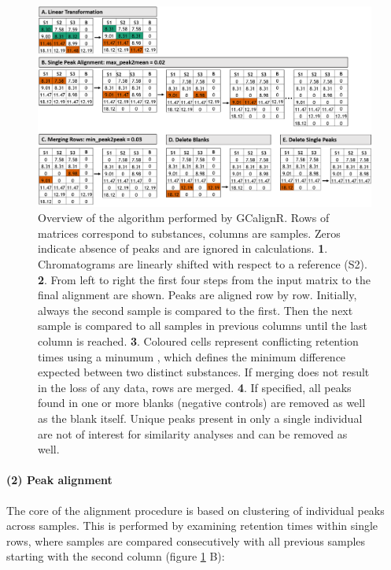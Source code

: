 \begin{figure}[htbp]
  \centering
  \includegraphics[width=13cm]{figures/algorithm}
  \caption{Overview of the algorithm performed by GCalignR. Rows of matrices correspond to substances, columns are samples. Zeros indicate absence of peaks and are ignored in calculations. \textbf{1}. Chromatograms are linearly shifted with respect to a reference (S2). \textbf{2}. From left to right the first four steps from the input matrix to the final alignment are shown. Peaks are aligned row by row. Initially, always the second sample is compared to the first. Then the next sample is compared to all samples in previous columns until the last column is reached. \textbf{3}. Coloured cells represent conflicting retention times using a minumum , which defines the minimum difference expected between two distinct substances. If merging does not result in the loss of any data, rows are merged. \textbf{4}. If specified, all peaks found in one or more blanks (negative controls) are removed as well as the blank itself. Unique peaks present in only a single individual are not of interest for similarity analyses and can be removed as well.}
  \label{figure:algorithm}
\end{figure}

\paragraph{(2) Peak alignment}\label{peak-alignment}

The core of the alignment procedure is based on clustering of individual
peaks across samples. This is performed by examining retention times
within single rows, where samples are compared consecutively with all
previous samples starting with the second column (figure
\ref{figure:algorithm} B):\par

